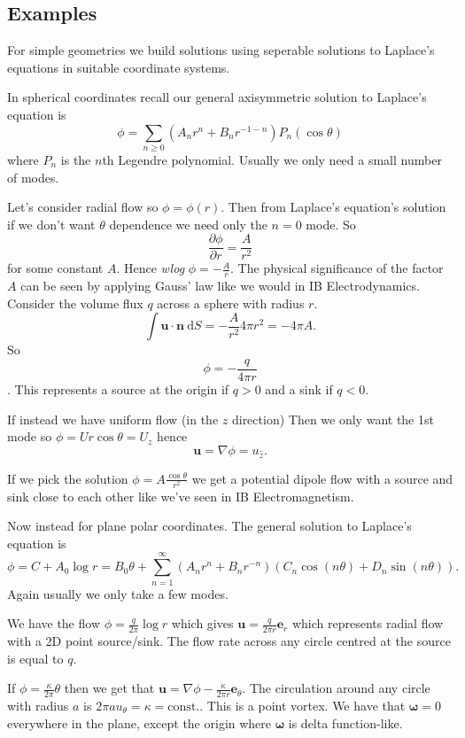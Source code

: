 \documentclass{article}
\begin{document}
\subsection{Examples}
For simple geometries we build solutions using seperable solutions to Laplace's equations in suitable coordinate systems.
\par
  In spherical coordinates recall our general axisymmetric solution to Laplace's equation is
  \[
	  \phi = \sum_{n\ge 0}(A_n r^n + B_n r^{-1-n})P_n(\cos\theta)
  \]
  where $ P_n $ is the $ n $th Legendre polynomial.
Usually we only need a small number of modes.
\begin{example}
  Let's consider radial flow so $ \phi= \phi(r) $. Then from Laplace's equation's solution if we don't want $ \theta $ dependence we need only the $ n=0 $ mode. So
  \[
	  \frac{\partial \phi}{\partial r } = \frac A{r^2}
  \]
  for some constant $ A $. Hence \textit{wlog} $ \phi = -\frac Ar $. The physical significance of the factor $ A $ can be seen by applying Gauss' law like we would in IB Electrodynamics. Consider the volume flux $ q $ across a sphere with radius $ r $.
  \[
	  \int \mathbf u \cdot\mathbf n\ \mathrm dS = -\frac {A}{r^2}{4\pi r^2} = - 4\pi A.
  \]
  So 
  \[
	  \phi = -\frac q{4\pi r}
  \].
  This represents a source at the origin if $ q>0 $ and a sink if $ q<0 $.
\end{example}
\begin{example}
  If instead we have uniform flow (in the $ z $ direction) Then we only want the 1st mode so $ \phi = Ur\cos\theta = U_z $ hence
  \[
	  \mathbf u = \nabla\phi = u_{\hat{z}}.
  \]
\end{example}
\begin{example}
	If we pick the solution $ \phi = A\frac{\cos\theta}{r^2} $ we get a potential dipole flow with a source and sink close to each other like we've seen in IB Electromagnetism.
\end{example}
Now instead for plane polar coordinates. The general solution to Laplace's equation is
\[
	\phi = C + A_0\log r = B_0\theta +\sum_{n=1}^\infty (A_nr^n+ B_nr^{-n})(C_n\cos(n\theta) + D_n\sin(n\theta)).
\]
Again usually we only take a few modes.
\begin{example}
	We have the flow $ \phi = \frac{q}{2\pi} \log r $ which gives $ \mathbf u = \frac{q}{2\pi r}\mathbf e_r $ which represents radial flow with a 2D point source/sink. The flow rate across any circle centred at the source is equal to $ q $.
\end{example}
\begin{example}
	If $ \phi = \frac{\kappa}{2\pi}\theta $ then we get that $ \mathbf u = \nabla\phi - \frac{\kappa}{2\pi r}\mathbf e_\theta $. The circulation around any circle with radius $ a $ is $ 2\pi au_\theta = \kappa=\text{const.} $. This is a point vortex. We have that $ \boldsymbol\omega=0 $ everywhere in the plane, except the origin where $ \boldsymbol \omega $ is delta function-like. 
\end{example}
\end{document}
